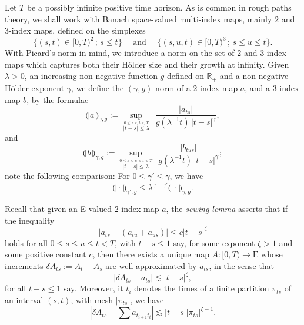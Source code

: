 \documentclass[11pt,a4paper]{amsart}
\newcommand{\RR}{\mathbb{R}}  \newcommand{\CC}{\mathbb{C}}  \newcommand{\LL}{\mathbb{L}}  \newcommand{\WW}{\mathbb{W}}
\renewcommand{\leq}{\leqslant}
\theoremstyle{plain}%
\theoremstyle{definition}
\theoremstyle{remark}
\numberwithin{equation}{section} %
\begin{document}
\medskip

Let $T$ be a possibly infinite positive time horizon. As is common in rough paths theory, we shall work with Banach space-valued multi-index maps, mainly $2$ and $3$-index maps, defined on the simplexes
$$
\{(s,t)\in [0,T)^2\,;\,s\leq t\}\quad \textrm{ and } \quad \{(s,u,t)\in [0,T)^3\,;\,s\leq u\leq t\}.
$$
With Picard's norm in mind, we introduce a norm on the set of $2$ and $3$-index maps which captures both their H\"older size and their growth at infinity. 
Given $\lambda >0$, an increasing non-negative function $g$ defined on $\RR_+$ and a non-negative H\"older exponent $\gamma$, we define the $(\gamma,g)$-norm of a $2$-index map $a$, and a $3$-index map $b$, by the formulae
$$
\llparenthesis\, a \,\rrparenthesis_{\gamma,g} := \underset{\stackrel{0\leq s<t<T}{|t-s|\le \lambda}}{\sup}\;\,\frac{| a_{ts}|}{g(\lambda^{-1} t)\,|t-s|^\gamma},
$$
and 
$$
\llparenthesis\, b \,\rrparenthesis_{\gamma,g} := \underset{\stackrel{0\leq s< u<t<T}{{|t-s|\le \lambda}}}{\sup}\;\,\frac{| b_{tus}|}{g(\lambda^{-1} t)\,|t-s|^\gamma};
$$
note the following comparison: For $0\leq \gamma'\leq \gamma$, we have
\begin{equation}
\label{EqComparisonNorms}
\llparenthesis\, \cdot \,\rrparenthesis_{\gamma',g} \leq \lambda^{\gamma-\gamma'} \llparenthesis\, \cdot \,\rrparenthesis_{\gamma,g}.
\end{equation}

\smallskip

Recall that given an E-valued $2$-index map $a$, the \textit{sewing lemma} \cite{Gubinelli04, FdlP} asserts that if the inequality
\begin{equation}
\label{EqAlmostAdditivity}
| a_{ts} - (a_{tu}+a_{us})| \leq c|t-s|^\zeta
\end{equation}
holds for all $0\leq s\leq u\leq t<T$, with $t-s\leq 1$ say, for some exponent $\zeta>1$ and some positive constant $c$, then there exists a unique map $A : [0,T)\rightarrow \textrm{E}$ whose increments $\delta A_{ts} := A_t-A_s$ are well-approximated by $a_{ts}$, in the sense that 
$$
|\delta A_{ts} - a_{ts} | \lesssim |t-s|^\zeta,
$$
for all $t-s\leq 1$ say. Moreover, it $t_i$ denotes the times of a finite partition $\pi_{ts}$ of an interval $(s,t)$, with mesh $|\pi_{ts}|$, we have
\begin{equation}
\label{EqEstimateAlmostAdditiveFunctional}
|\delta A_{ts} - \sum a_{t_{i+1}t_i}| \lesssim |t-s||\pi_{ts}|^{\zeta-1}.
\end{equation}

\smallskip
\end{document}
